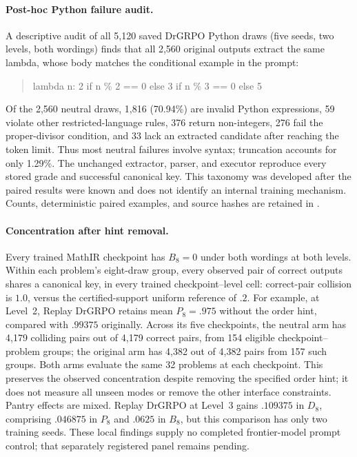 \documentclass{article}
\newcommand{\1}{\mathbf 1}
\theoremstyle{remark}
\theoremstyle{definition}
\theoremstyle{plain}
\begin{document}
\paragraph{Post-hoc Python failure audit.}
A descriptive audit of all 5,120 saved DrGRPO Python draws (five seeds,
two levels, both wordings) finds that all 2,560 original outputs extract
the same lambda, whose body matches the conditional example in the prompt:
\begin{quote}\footnotesize\ttfamily
lambda n: 2 if n \% 2 == 0 else 3 if n \% 3 == 0 else 5
\end{quote}
Of the 2,560 neutral draws, 1,816 (70.94\%) are invalid Python expressions,
59 violate other restricted-language rules, 376 return non-integers,
276 fail the proper-divisor condition, and 33 lack an extracted candidate
after reaching the token limit. Thus most neutral failures involve syntax;
truncation accounts for only 1.29\%. The unchanged extractor, parser, and
executor reproduce every stored grade and successful canonical key.
This taxonomy was developed after the paired results were known and does
not identify an internal training mechanism. Counts, deterministic paired
examples, and source hashes are retained in
.

\paragraph{Concentration after hint removal.}
Every trained MathIR checkpoint has $B_8=0$ under both wordings at both levels.
Within each problem's eight-draw group, every observed pair of correct
outputs shares a canonical key, in every trained checkpoint--level cell:
correct-pair collision is $1.0$, versus the
certified-support uniform reference of $.2$. For example, at Level~2, Replay
DrGRPO retains mean $P_8=.975$ without the order hint, compared with $.99375$
originally. Across its five checkpoints, the neutral arm has 4,179 colliding
pairs out of 4,179 correct pairs, from 154 eligible checkpoint--problem
groups; the original arm has 4,382 out of 4,382 pairs from 157 such groups.
Both arms evaluate the same 32 problems at each checkpoint. This preserves
the observed concentration despite removing the specified order hint; it does
not measure all unseen modes or remove the other interface constraints.
Pantry effects are mixed. Replay DrGRPO at Level~3 gains $.109375$ in $D_8$,
comprising $.046875$ in $P_8$ and $.0625$ in $B_8$, but this comparison has only
two training seeds. These local findings supply no completed frontier-model
prompt control; that separately registered panel remains pending.
\end{document}
